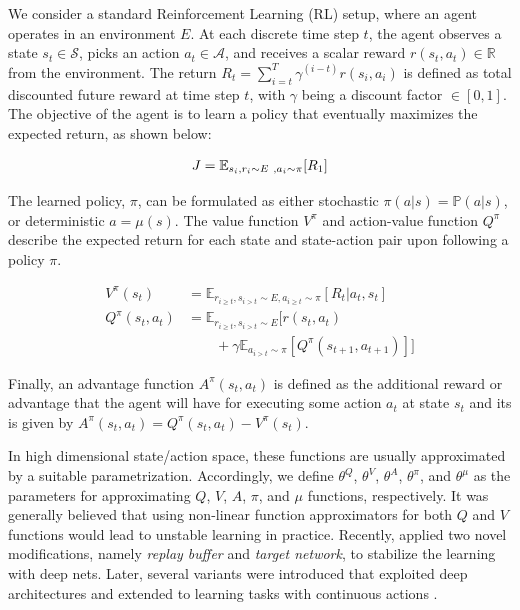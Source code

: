 \documentclass[../thesis.tex]{subfiles}
\begin{document}

We consider a standard Reinforcement Learning (RL) setup, where an agent operates in an environment ${E}$. At each discrete time step $t$, the agent observes a state $s_t \in \mathcal{S}$, picks an action $a_t \in \mathcal{A}$, and receives a scalar reward $r(s_t, a_t) \in \mathbb{R}$ from the environment. The return $R_t = \sum^T_{i=t} \gamma^{(i-t)}r(s_i,a_i)$ is defined as total discounted future reward at time step $t$, with $\gamma$ being a discount factor $\in [0,1]$. The objective of the agent is to learn a policy that eventually maximizes the expected return, as shown below:

\begin{align}
\centering
J = \mathbb{E}_{s_i, r_i \sim E~, a_i \sim \pi}[R_1] \label{equ:obj-func} 
\end{align}

The learned policy, $\pi$, can be formulated as either stochastic $\pi(a|s) = \mathbb{P}(a|s)$, or deterministic $a = \mu(s)$. The value function $V^{\pi}$ and action-value function $Q^{\pi}$ describe the expected return for each state and state-action pair upon following a policy $\pi$. 

\begin{align}
V^\pi(s_t) &= \mathbb{E}_{r_{i \geq t}, s_{i > t} \sim E, a_{i \geq t} \sim \pi} [R_t | a_t, s_t] \\
Q^\pi(s_t, a_t) &= \mathbb{E}_{r_{i \geq t}, s_{i > t} \sim E} [r(s_t, a_t) \nonumber \\
&\qquad + \gamma \mathbb{E}_{a_{i > t} \sim \pi} [Q^\pi(s_{t+1}, a_{t+1})]]
\end{align}

Finally, an advantage function $A^{\pi}(s_t,a_t)$ is defined as the additional reward or advantage that the agent will have for executing some action $a_t$ at state $s_t$ and its is given by $A^{\pi}(s_t,a_t) = Q^\pi(s_t, a_t) - V^\pi(s_t)$. 


In high dimensional state/action space, these functions are usually approximated by a suitable parametrization. Accordingly, we define $\theta^Q$, $\theta^V$, $\theta^A$, $\theta^\pi$, and $\theta^\mu$ as the parameters for approximating $Q$, $V$, $A$, $\pi$, and $\mu$ functions, respectively. It was generally believed that using non-linear function approximators for both $Q$ and $V$ functions would lead to unstable learning in practice. Recently, \citet{mnih2013playing} applied two novel modifications, namely \textit{replay buffer} and \textit{target network}, to stabilize the learning with deep nets. Later, several variants were introduced that exploited deep architectures and extended to learning tasks with continuous actions \cite{DBLP:journals/corr/LillicrapHPHETS15,A3C,CDQN,TRPO}. 
\end{document}
